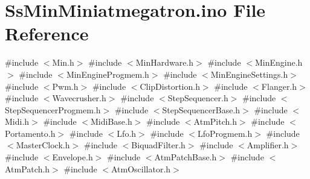 \hypertarget{_ss_min_miniatmegatron_8ino}{}\section{Ss\+Min\+Miniatmegatron.\+ino File Reference}
\label{_ss_min_miniatmegatron_8ino}
{\ttfamily \#include $<$Min.\+h$>$}\newline
{\ttfamily \#include $<$Min\+Hardware.\+h$>$}\newline
{\ttfamily \#include $<$Min\+Engine.\+h$>$}\newline
{\ttfamily \#include $<$Min\+Engine\+Progmem.\+h$>$}\newline
{\ttfamily \#include $<$Min\+Engine\+Settings.\+h$>$}\newline
{\ttfamily \#include $<$Pwm.\+h$>$}\newline
{\ttfamily \#include $<$Clip\+Distortion.\+h$>$}\newline
{\ttfamily \#include $<$Flanger.\+h$>$}\newline
{\ttfamily \#include $<$Wavecrusher.\+h$>$}\newline
{\ttfamily \#include $<$Step\+Sequencer.\+h$>$}\newline
{\ttfamily \#include $<$Step\+Sequencer\+Progmem.\+h$>$}\newline
{\ttfamily \#include $<$Step\+Sequencer\+Base.\+h$>$}\newline
{\ttfamily \#include $<$Midi.\+h$>$}\newline
{\ttfamily \#include $<$Midi\+Base.\+h$>$}\newline
{\ttfamily \#include $<$Atm\+Pitch.\+h$>$}\newline
{\ttfamily \#include $<$Portamento.\+h$>$}\newline
{\ttfamily \#include $<$Lfo.\+h$>$}\newline
{\ttfamily \#include $<$Lfo\+Progmem.\+h$>$}\newline
{\ttfamily \#include $<$Master\+Clock.\+h$>$}\newline
{\ttfamily \#include $<$Biquad\+Filter.\+h$>$}\newline
{\ttfamily \#include $<$Amplifier.\+h$>$}\newline
{\ttfamily \#include $<$Envelope.\+h$>$}\newline
{\ttfamily \#include $<$Atm\+Patch\+Base.\+h$>$}\newline
{\ttfamily \#include $<$Atm\+Patch.\+h$>$}\newline
{\ttfamily \#include $<$Atm\+Oscillator.\+h$>$}\newline
